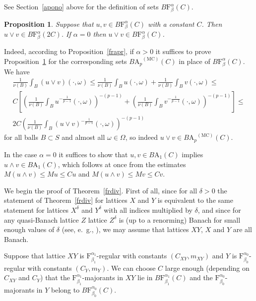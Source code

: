 \documentclass[12pt]{amsart}
\newtheorem {proposition} [theorem] {Proposition}
\newcommand {\apclass} [1] {\ensuremath{\mathrm A_{#1}}}
\newcommand {\frclass} [2] {\ensuremath{\mathrm F^{#1}_{#2}}}
\newcommand {\weightu} {\ensuremath {\mathit u}}
\newcommand {\weightv} {\ensuremath {\mathit v}}
\newcommand {\abp} [2] {\ensuremath {B\apclass {#1}^{(\mathrm {MC})} \left(#2\right)}}
\newcommand {\abpo} [2] {\ensuremath {B\apclass {#1} \left(#2\right)}}
\newcommand {\fbab} [3] {\ensuremath {B\frclass {#1} {#2} \left(#3\right)}}
\begin{document}
See Section~\ref {apono} above for the definition of sets $\fbab {\alpha} {\beta} {C}$.

\begin {proposition}
\label {fbmax}
Suppose that $\weightu, \weightv \in \fbab {\alpha} {\beta} {C}$ with a constant $C$.
Then $\weightu \vee \weightv \in \fbab {\alpha} {\beta} {2 C}$.
If $\alpha = 0$ then $\weightu \vee \weightv \in \fbab {\alpha} {\beta} {C}$.
\end {proposition}
Indeed, according to Proposition~\ref {frapr},
if $\alpha > 0$ it suffices to prove Proposition~\ref {fbmax} for the corresponding sets $\abp {p} {C}$
in place of $\fbab {\alpha} {\beta} {C}$.
We have
\begin {multline*}
\frac 1 {\nu (B)} \int_B (\weightu \vee \weightv) (\cdot, \omega) \leqslant
\frac 1 {\nu (B)} \int_B \weightu (\cdot, \omega) + \frac 1 {\nu (B)} \int_B \weightv (\cdot, \omega)\leqslant
\\
C \left[\left(\frac 1 {\nu (B)} \int_B \weightu^{-\frac 1 {p - 1}} (\cdot, \omega)\right)^{-(p - 1)} +
\left(\frac 1 {\nu (B)} \int_B \weightv^{-\frac 1 {p - 1}} (\cdot, \omega)\right)^{-(p - 1)}
\right] \leqslant
\\
2 C \left(\frac 1 {\nu (B)} \int_B (\weightu \vee \weightv)^{-\frac 1 {p - 1}} (\cdot, \omega)\right)^{-(p - 1)}
\end {multline*}
for all balls $B \subset S$ and almost all $\omega \in \Omega$, so indeed
$\weightu \vee \weightv \in \abp {p} {C}$.

In the case $\alpha = 0$ it suffices to show that $\weightu, \weightv \in \abpo {1} {C}$ implies
$\weightu \wedge \weightv \in \abpo {1} {C}$, which follows at once from the estimates
$M (\weightu \wedge \weightv) \leqslant M \weightu \leqslant C \weightu$ and 
$M (\weightu \wedge \weightv) \leqslant M \weightv \leqslant C \weightv$.

We begin the proof of Theorem~\ref {frdiv}.
First of all, since for all $\delta > 0$ the statement of Theorem~\ref {frdiv} for lattices $X$ and $Y$
is equivalent to the same statement for lattices $X^\delta$ and $Y^\delta$ with all indices multiplied by $\delta$,
and since for any quasi-Banach lattice $Z$ lattice $Z^\delta$ is (up to a renorming)
Banach for small enough values of $\delta$ (see, e.~g., \cite [Theorem~3.2.1] {rolewicz1985}),
we may assume that lattices $X Y$, $X$ and $Y$ are all Banach.

Suppose that lattice $X Y$ is $\frclass {\alpha_1} {\beta_1}$-regular with constants $\left(C_{XY}, m_{XY}\right)$
and $Y$ is $\frclass {\alpha_0} {\beta_0}$-regular with constants $(C_Y, m_Y)$.
We can choose $C$ large enough (depending on $C_{XY}$ and $C_Y$) that the 
$\frclass {\alpha_1} {\beta_1}$-majorants in $X Y$ lie in $\fbab {\alpha_1} {\beta_1} {C}$
and the $\frclass {\alpha_0} {\beta_0}$-majorants in $Y$ belong to $\fbab {\alpha_0} {\beta_0} {C}$.
\end{document}
